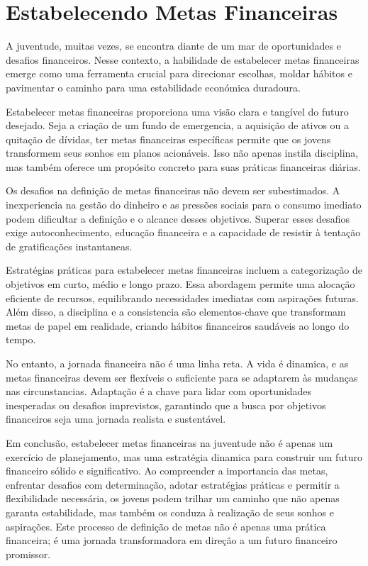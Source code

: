 \documentclass{report}
\begin{document}
\chapter{Estabelecendo Metas Financeiras}
\label{chap:Estabelecendo Metas Financeiras}

A juventude, muitas vezes, se encontra diante de um mar de oportunidades e desafios financeiros. Nesse contexto, a habilidade de estabelecer metas financeiras emerge como uma ferramenta crucial para direcionar escolhas, moldar hábitos e pavimentar o caminho para uma estabilidade económica duradoura.

Estabelecer metas financeiras proporciona uma visão clara e tangível do futuro desejado. Seja a criação de um fundo de emergencia, a aquisição de ativos ou a quitação de dívidas, ter metas financeiras específicas permite que os jovens transformem seus sonhos em planos acionáveis. Isso não apenas instila disciplina, mas também oferece um propósito concreto para suas práticas financeiras diárias.

Os desafios na definição de metas financeiras não devem ser subestimados. A inexperiencia na gestão do dinheiro e as pressões sociais para o consumo imediato podem dificultar a definição e o alcance desses objetivos. Superar esses desafios exige autoconhecimento, educação financeira e a capacidade de resistir à tentação de gratificações instantaneas.

Estratégias práticas para estabelecer metas financeiras incluem a categorização de objetivos em curto, médio e longo prazo. Essa abordagem permite uma alocação eficiente de recursos, equilibrando necessidades imediatas com aspirações futuras. Além disso, a disciplina e a consistencia são elementos-chave que transformam metas de papel em realidade, criando hábitos financeiros saudáveis ao longo do tempo.

No entanto, a jornada financeira não é uma linha reta. A vida é dinamica, e as metas financeiras devem ser flexíveis o suficiente para se adaptarem às mudanças nas circunstancias. Adaptação é a chave para lidar com oportunidades inesperadas ou desafios imprevistos, garantindo que a busca por objetivos financeiros seja uma jornada realista e sustentável.

Em conclusão, estabelecer metas financeiras na juventude não é apenas um exercício de planejamento, mas uma estratégia dinamica para construir um futuro financeiro sólido e significativo. Ao compreender a importancia das metas, enfrentar desafios com determinação, adotar estratégias práticas e permitir a flexibilidade necessária, os jovens podem trilhar um caminho que não apenas garanta estabilidade, mas também os conduza à realização de seus sonhos e aspirações. Este processo de definição de metas não é apenas uma prática financeira; é uma jornada transformadora em direção a um futuro financeiro promissor.
\end{document}
